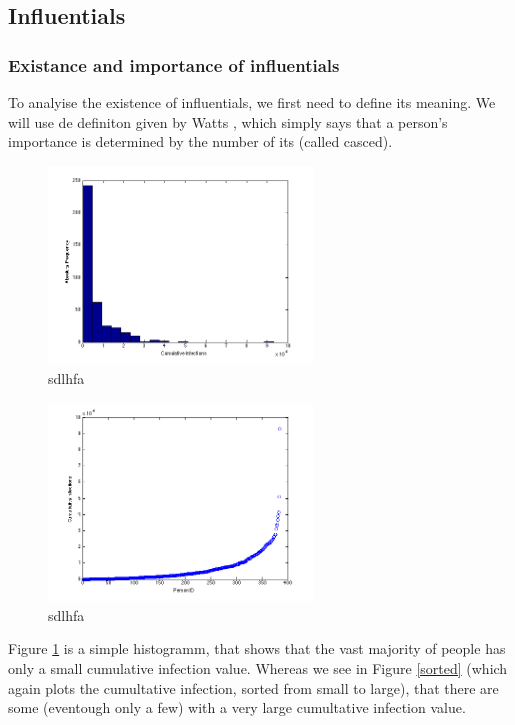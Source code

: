 \subsection{Influentials}

\subsubsection{Existance and importance of influentials}


To analyise the existence of influentials, we first need to define its meaning. We will use de definiton given by Watts \cite{influentials}, which simply says that a person's importance is determined by the number of its  (called casced).

\begin{figure}
\includegraphics[width=7cm]{influ2}
\caption{sdlhfa}
\label{Histo}
\end{figure}

\begin{figure}
\includegraphics[width=7cm]{influ1}
\caption{sdlhfa}
\label{Sorted}
\end{figure}

Figure \ref{Histo} is a simple histogramm, that shows that the vast majority of people has only a small cumulative infection value. Whereas we see in Figure \ref{sorted} (which again plots the cumultative infection, sorted from small to large), that there are some (eventough only a few) with a very large cumultative infection value. \\

